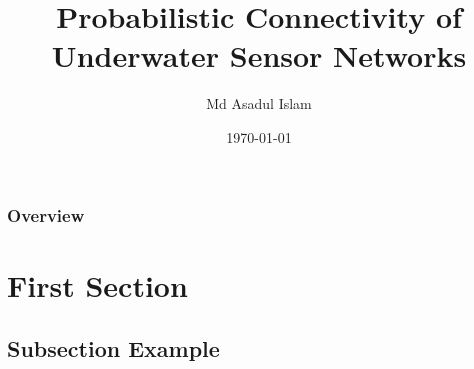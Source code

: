 \documentclass{beamer}
\title[Prob. Conn of USN]{Probabilistic Connectivity of Underwater Sensor Networks} %
\author{Md Asadul Islam} %
\institute[UofA] %
{
University of Alberta \\ %
\medskip
\textit{mdasadul@ualberta.ca} %
}
\date{\today} %
\begin{document}
\begin{frame}
\titlepage %
\end{frame}

\begin{frame}
\frametitle{Overview} %
\tableofcontents %
\end{frame}


\section{First Section} %

\subsection{Subsection Example} %

\end{document}
